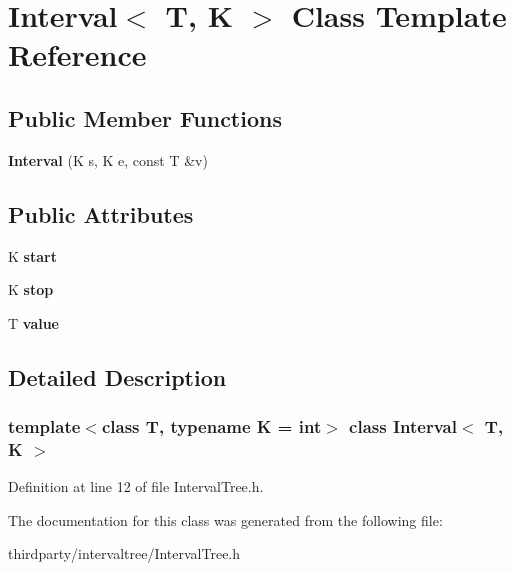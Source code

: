 \hypertarget{class_interval}{}\section{Interval$<$ T, K $>$ Class Template Reference}
\label{class_interval}
\subsection*{Public Member Functions}
\begin{DoxyCompactItemize}
\item 
\mbox{\label{class_interval_a5420dafdfa1cb3737217718f287337f4}} 
{\bfseries Interval} (K s, K e, const T \&v)
\end{DoxyCompactItemize}
\subsection*{Public Attributes}
\begin{DoxyCompactItemize}
\item 
\mbox{\label{class_interval_a64db0c22ce70319e2c9de4579757cbe6}} 
K {\bfseries start}
\item 
\mbox{\label{class_interval_a28ce7ff7b5a8ea6fab08890f0c3e1cbf}} 
K {\bfseries stop}
\item 
\mbox{\label{class_interval_a43f7288f9a58626803e8cb5a955c61e9}} 
T {\bfseries value}
\end{DoxyCompactItemize}


\subsection{Detailed Description}
\subsubsection*{template$<$class T, typename K = int$>$\newline
class Interval$<$ T, K $>$}



Definition at line 12 of file Interval\+Tree.\+h.



The documentation for this class was generated from the following file\+:\begin{DoxyCompactItemize}
\item 
thirdparty/intervaltree/Interval\+Tree.\+h\end{DoxyCompactItemize}
